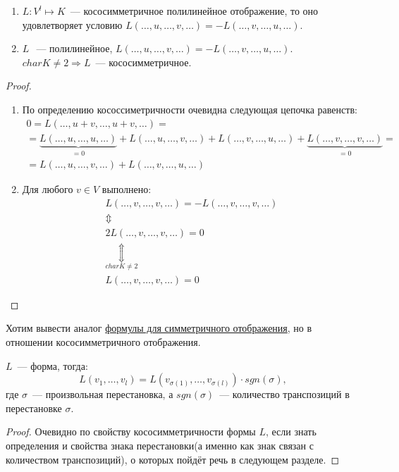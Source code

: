 \begin{statement}\leavevmode
    \begin{enumerate}
        \item
            $L: V^l\mapsto K$~--- кососимметричное полилинейное отображение, то
            оно удовлетворяет условию $L(\dots, u,\dots, v,\dots) = -L(\dots,v,\dots,u,\dots)$.
        \item 
            $L~$~--- полилинейное, $L(\dots, u,\dots,v,\dots) = -L(\dots, v,\dots, u,\dots)$.
            $char K \not= 2 \Rightarrow L$~--- кососимметричное.
    \end{enumerate}
\end{statement}
\begin{proof}\leavevmode\\
    \begin{enumerate}
        \item
            По определению кососсиметричности очевидна следующая цепочка равенств:
            \[
                \begin{gathered}
                    0 = L(\dots, u + v, \dots, u + v,\dots) =\\=
                    \underbrace{L(\dots, u,\dots, u,\dots)}_{=0} + L(\dots, u, \dots, v,\dots) + 
                    L(\dots, v,\dots,u,\dots)+\underbrace{L(\dots, v,\dots, v, \dots)}_{=0}=\\=
                    L(\dots, u,\dots, v,\dots) + L(\dots, v,\dots, u,\dots)
                \end{gathered}
            \]
        \item
            Для любого $v\in V$ выполнено:
            \[
                \begin{gathered}
                    L(\dots, v,\dots,v,\dots) = -L(\dots,v,\dots,v,\dots)
                    \\\Updownarrow\\
                    2L(\dots,v,\dots,v,\dots) = 0 
                    \\\underset{char K \not= 2}{\Updownarrow}\\
                    L(\dots, v,\dots,v,\dots) = 0
                \end{gathered}
            \]
    \end{enumerate}
\end{proof}
\begin{motivation}
    Хотим вывести аналог \hyperref[eq:7:1]{формулы для симметричного отображения}, но в отношении кососимметричного отображения.
\end{motivation}
\begin{statement}
    $L$~--- форма, тогда:
    \[
        L(v_1,\dots, v_l) = L(v_{\sigma(1)},\dots, v_{\sigma(l)})\cdot sgn(\sigma),
    \]
    где $\sigma$~--- произвольная перестановка, а $sgn(\sigma)$~--- количество транспозиций в перестановке $\sigma$.
\end{statement}
\begin{proof}
    Очевидно по свойству кососимметричности формы $L$, если знать 
    определения и свойства знака перестановки(а именно как знак связан с количеством транспозиций),
    о которых пойдёт речь в следующем разделе.
\end{proof}
